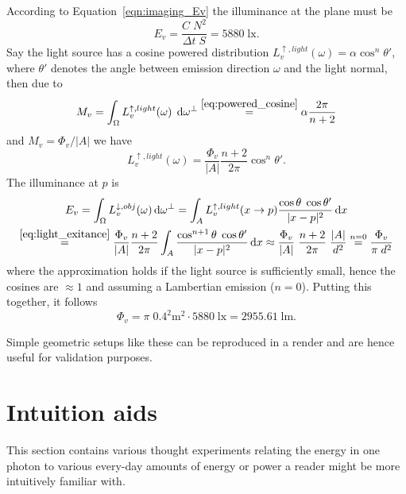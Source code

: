 According to Equation~\eqref{eqn:imaging_Ev} the illuminance at the plane must be 
\begin{displaymath}
  E_v = \frac{C\;N^2}{\Delta t\; S} = 5880\; \unit{\lux}.
\end{displaymath}
Say the light source has a cosine powered distribution
$L_v^{\uparrow,light}(\omega) = \alpha \cos^n \theta'$, where
$\theta'$ denotes the angle between emission direction $\omega$ and
the light normal, then due to
\begin{displaymath}
  M_v = \int_\Omega L_v^{\uparrow,light}(\omega) \; \mathop{}\!\mathrm{d} \omega^\bot \stackrel{\eqref{eq:powered_cosine}}= \alpha \frac{2\pi}{n+2}
\end{displaymath}
and $M_v = \Phi_v / |A|$
we have
\begin{equation}\label{eq:light_exitance}
  L_v^{\uparrow,light}(\omega) = \frac{\Phi_v}{|A|} \frac{n+2}{2\pi} \cos^n \theta'.
\end{equation}
The illuminance at $p$ is
\begin{multline*}
  E_v = \int_\Omega L_v^{\downarrow,obj}(\omega) \mathop{}\!\mathrm{d}\omega^{\bot} = \int_A L_v^{\uparrow,light}(x\to p) \frac{\cos \theta\; \cos \theta'}{|x-p|^2} \mathop{}\!\mathrm{d} x \\
  \stackrel{\eqref{eq:light_exitance}} =  \frac{\Phi_v}{|A|} \frac{n+2}{2\pi} \int_A  \frac{\cos^{n+1} \theta\; \cos \theta'}{|x-p|^2} \mathop{}\!\mathrm{d} x
  \approx \frac{ \Phi_v }{|A|}\; \frac{n+2}{2\pi}\; \frac{|A|}{d^2} \stackrel{n=0}= \frac{\Phi_v}{\pi\;d^2}
\end{multline*}
where the approximation holds if the light source is sufficiently small, hence the cosines are $\approx 1$ and assuming a Lambertian emission ($n=0$).
Putting this together, it follows 
\begin{displaymath}
  \Phi_v = \pi \; 0.4^2 \unit{\square\meter}\cdot 5880\; \unit{\lux} = 2955.61\; \unit{\lumen}.
\end{displaymath}

Simple geometric setups like these can be reproduced in a render and are hence useful for validation purposes.

\section{Intuition aids}

This section contains various thought experiments relating the energy in one photon to 
various every-day amounts of energy or power a reader might be more intuitively familiar with.

